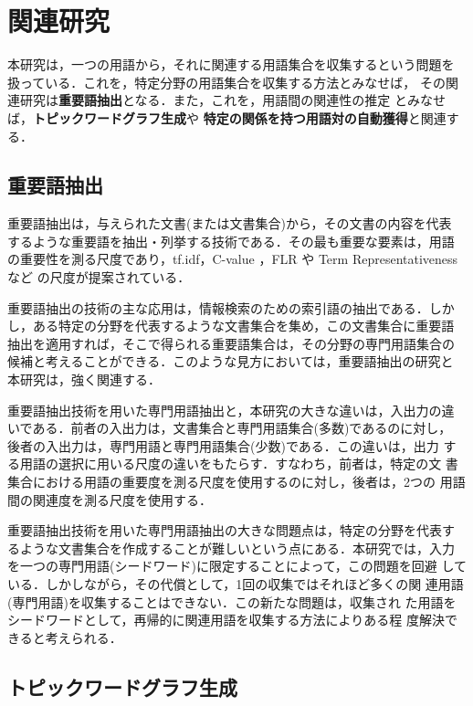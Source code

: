 \section{関連研究} \label{chap5}

本研究は，一つの用語から，それに関連する用語集合を収集するという問題を
扱っている．これを，特定分野の用語集合を収集する方法とみなせば，
その関連研究は{\bf 重要語抽出}となる．また，これを，用語間の関連性の推定
とみなせば，{\bf トピックワードグラフ生成}や
{\bf 特定の関係を持つ用語対の自動獲得}と関連する．


\subsection{重要語抽出}

重要語抽出は，与えられた文書(または文書集合)から，その文書の内容を代表
するような重要語を抽出・列挙する技術である．その最も重要な要素は，用語
の重要性を測る尺度であり，tf.idf，C-value
，FLR や
Term Representativeness など
の尺度が提案されている．

重要語抽出の技術の主な応用は，情報検索のための索引語の抽出である．しか
し，ある特定の分野を代表するような文書集合を集め，この文書集合に重要語
抽出を適用すれば，そこで得られる重要語集合は，その分野の専門用語集合の
候補と考えることができる．このような見方においては，重要語抽出の研究と
本研究は，強く関連する．

重要語抽出技術を用いた専門用語抽出と，本研究の大きな違いは，入出力の違
いである．前者の入出力は，文書集合と専門用語集合(多数)であるのに対し，
後者の入出力は，専門用語と専門用語集合(少数)である．この違いは，出力
する用語の選択に用いる尺度の違いをもたらす．すなわち，前者は，特定の文
書集合における用語の重要度を測る尺度を使用するのに対し，後者は，2つの
用語間の関連度を測る尺度を使用する．

重要語抽出技術を用いた専門用語抽出の大きな問題点は，特定の分野を代表す
るような文書集合を作成することが難しいという点にある．本研究では，入力
を一つの専門用語(シードワード)に限定することによって，この問題を回避
している．しかしながら，その代償として，1回の収集ではそれほど多くの関
連用語(専門用語)を収集することはできない．この新たな問題は，収集され
た用語をシードワードとして，再帰的に関連用語を収集する方法によりある程
度解決できると考えられる．


\subsection{トピックワードグラフ生成}

